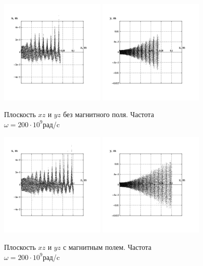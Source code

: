 \documentclass[a4paper,14pt]{extreport} %
\begin{document}
\clearpage
\begin{figure}[c]
	\parbox{0.48\textwidth}{
		\includegraphics[width = 0.45\textwidth]{images/png/without_mf/200xz.png}
		\includegraphics[width = 0.45\textwidth]{images/png/without_mf/200yz.png}
		\caption{Плоскость $xz$ и $yz$ без магнитного поля. Частота \\
			$\omega = 200\cdot10^9$рад/c}
	}
	\quad
	\parbox{0.48\textwidth}{
		\includegraphics[width = 0.45\textwidth]{images/png/withmf/200xz.png}
		\includegraphics[width = 0.45\textwidth]{images/png/withmf/200yz.png}
		\caption{Плоскость $xz$ и $yz$ с магнитным полем. Частота \\
			$\omega = 200\cdot10^9$рад/c}
	}
\end{figure}
\clearpage
\end{document}
